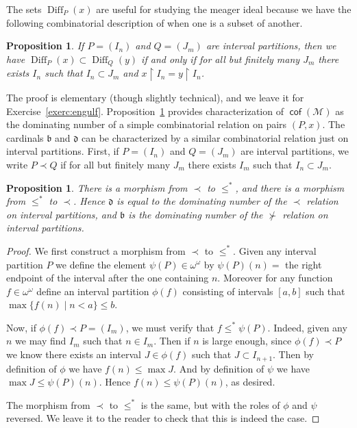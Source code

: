 \documentclass[11pt,oneside,a4paper]{amsbook}
\newcommand{\Meager}{\mathcal M}
\DeclareMathOperator{\cof}{\mathsf{cof}}
\DeclareMathOperator{\Diff}{Diff}
\theoremstyle{definition}
\theoremstyle{plain}
\newtheorem{proposition}[theorem]{Proposition}
\theoremstyle{definition}
\theoremstyle{remark}
\numberwithin{equation}{section}
\numberwithin{figure}{section}
\begin{document}
The sets $\Diff_P(x)$ are useful for studying the meager ideal because we have the following combinatorial description of when one is a subset of another.

\begin{proposition}
  \label{prop:engulf}
  If $P=(I_n)$ and $Q=(J_m)$ are interval partitions, then we have $\Diff_P(x)\subset\Diff_Q(y)$ if and only if for all but finitely many $J_m$ there exists $I_n$ such that $I_n\subset J_m$ and $x\restriction I_n=y\restriction I_n$.
\end{proposition}

The proof is elementary (though slightly technical), and we leave it for Exercise~\ref{exerc:engulf}. Proposition~\ref{prop:engulf} provides characterization of $\cof(\Meager)$ as the dominating number of a simple combinatorial relation on pairs $(P,x)$. The cardinals $\mathfrak b$ and $\mathfrak d$ can be characterized by a similar combinatorial relation just on interval partitions. First, if $P=(I_n)$ and $Q=(J_m)$ are interval partitions, we write $P\prec Q$ if for all but finitely many $J_m$ there exists $I_m$ such that $I_n\subset J_m$.

\begin{proposition}
  There is a morphism from $\prec$ to $\leq^*$, and there is a morphism from $\leq^*$ to $\prec$. Hence $\mathfrak d$ is equal to the dominating number of the $\prec$ relation on interval partitions, and $\mathfrak b$ is the dominating number of the $\not\succ$ relation on interval partitions.
\end{proposition}

\begin{proof}
  We first construct a morphism from $\prec$ to $\leq^*$. Given any interval partition $P$ we define the element $\psi(P)\in\omega^\omega$ by $\psi(P)(n)=$ the right endpoint of the interval after the one containing $n$. Moreover for any function $f\in\omega^\omega$ define an interval partition $\phi(f)$ consisting of intervals $[a,b]$ such that $\max\{f(n)\mid n<a\}\leq b$.

  Now, if $\phi(f)\prec P=(I_m)$, we must verify that $f\leq^*\psi(P)$. Indeed, given any $n$ we may find $I_m$ such that $n\in I_m$. Then if $n$ is large enough, since $\phi(f)\prec P$ we know there exists an interval $J\in\phi(f)$ such that $J\subset I_{n+1}$. Then by definition of $\phi$ we have $f(n)\leq\max J$. And by definition of $\psi$ we have $\max J\leq\psi(P)(n)$. Hence $f(n)\leq\psi(P)(n)$, as desired.

  The morphism from $\prec$ to $\leq^*$ is the same, but with the roles of $\phi$ and $\psi$ reversed. We leave it to the reader to check that this is indeed the case.
\end{proof}
\end{document}
